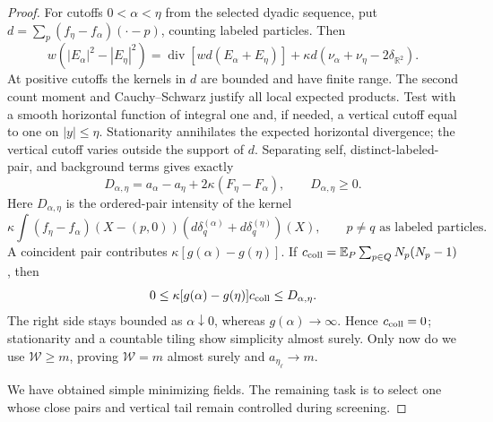 \begin{proof}
For cutoffs $0<\alpha<\eta$ from the selected dyadic sequence, put
$d=\sum_p(f_\eta-f_\alpha)(\cdot-p)$, counting labeled particles.  Then
\begin{equation}
 w(|E_\alpha|^2-|E_\eta|^2)
  =\operatorname{div}[wd(E_\alpha+E_\eta)]
     +\kappa d(\nu_\alpha+\nu_\eta-2\delta_{\mathbb R^2}).
 \label{eq:normalized-two-cutoff-local}
\end{equation}
At positive cutoffs the kernels in $d$ are bounded and have finite
range.  The second count moment and Cauchy--Schwarz justify all local
expected products.  Test with a smooth horizontal function of integral
one and, if needed, a vertical cutoff equal to one on $|y|\le\eta$.
Stationarity annihilates the expected horizontal divergence; the
vertical cutoff varies outside the support of $d$.  Separating self,
distinct-labeled-pair, and background terms gives exactly
\begin{equation}
 D_{\alpha,\eta}=a_\alpha-a_\eta+2\kappa(F_\eta-F_\alpha),
 \qquad D_{\alpha,\eta}\ge0.
 \label{eq:normalized-two-cutoff-mean}
\end{equation}
Here $D_{\alpha,\eta}$ is the ordered-pair intensity of the kernel
\[
 \kappa\int(f_\eta-f_\alpha)(X-(p,0))
                (d\delta_q^{(\alpha)}+d\delta_q^{(\eta)})(X),
 \qquad p\ne q\text{ as labeled particles}.
\]
A coincident pair contributes $\kappa[g(\alpha)-g(\eta)]$.
If $c_{\rm coll}=\mathbb E_P\sum_{p\in Q}N_p(N_p-1)$, then
\[
 0\le\kappa[g(\alpha)-g(\eta)]c_{\rm coll}
       \le D_{\alpha,\eta}.
\]
The right side stays bounded as $\alpha\downarrow0$, whereas
$g(\alpha)\to\infty$.  Hence $c_{\rm coll}=0$; stationarity and a
countable tiling show simplicity almost surely.  Only now do we use
$\mathcal W\ge m$, proving $\mathcal W=m$ almost surely and
$a_{\eta_\ell}\to m$.

We have obtained simple minimizing fields. The remaining task is to select
one whose close pairs and vertical tail remain controlled during screening.


\end{proof}
